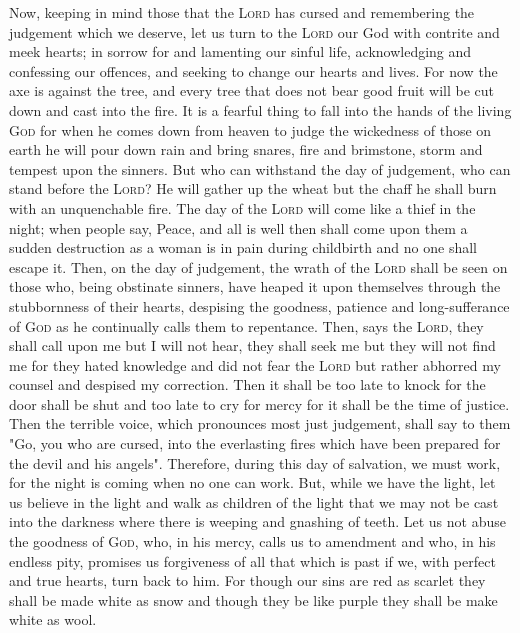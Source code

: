 \documentclass{liturgy}
\begin{document}
\begin{leader}
  \noindent
  Now, keeping in mind those that the \textsc{Lord} has cursed and remembering the judgement which we deserve, let us turn to the \textsc{Lord} our God with contrite and meek hearts; in sorrow for and lamenting our sinful life, acknowledging and confessing our offences, and seeking to change our hearts and lives.
  For now the axe is against the tree, and every tree that does not bear good fruit will be cut down and cast into the fire.
  It is a fearful thing to fall into the hands of the living \textsc{God} for when he comes down from heaven to judge the wickedness of those on earth he will pour down rain and bring snares, fire and brimstone, storm and tempest upon the sinners.
  But who can withstand the day of judgement, who can stand before the \textsc{Lord}? He will gather up the wheat but the chaff he shall burn with an unquenchable fire.
  The day of the \textsc{Lord} will come like a thief in the night; when people say, Peace, and all is well then shall come upon them a sudden destruction as a woman is in pain during childbirth and no one shall escape it.
  Then, on the day of judgement, the wrath of the \textsc{Lord} shall be seen on those who, being obstinate sinners, have heaped it upon themselves through the stubbornness of their hearts, despising the goodness, patience and long-sufferance of \textsc{God} as he continually calls them to repentance.
  Then, says the \textsc{Lord}, they shall call upon me but I will not hear, they shall seek me but they will not find me for they hated knowledge and did not fear the \textsc{Lord} but rather abhorred my counsel and despised my correction.
  Then it shall be too late to knock for the door shall be shut and too late to cry for mercy for it shall be the time of justice.
  Then the terrible voice, which pronounces most just judgement, shall say to them "Go, you who are cursed, into the everlasting fires which have been prepared for the devil and his angels".
  Therefore, during this day of salvation, we must work, for the night is coming when no one can work.
  But, while we have the light, let us believe in the light and walk as children of the light that we may not be cast into the darkness where there is weeping and gnashing of teeth.
  Let us not abuse the goodness of \textsc{God}, who, in his mercy, calls us to amendment and who, in his endless pity, promises us forgiveness of all that which is past if we, with perfect and true hearts, turn back to him.
  For though our sins are red as scarlet they shall be made white as snow and though they be like purple they shall be make white as wool.

\end{leader}
\end{document}
